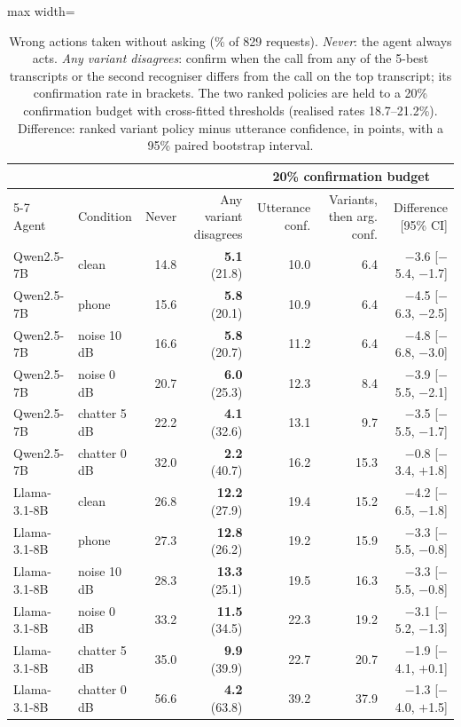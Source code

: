 \begin{table}[t]\centering\small
\begin{adjustbox}{max width=\linewidth}\begin{tabular}{llrrrrr}\toprule
 & & & & \multicolumn{3}{c}{20\% confirmation budget} \\ \cmidrule(lr){5-7}
Agent & Condition & Never & Any variant disagrees & Utterance conf. & Variants, then arg. conf. & Difference [95\% CI] \\
\midrule
Qwen2.5-7B & clean & 14.8 & \textbf{5.1} (21.8) & 10.0 & 6.4 & $-$3.6 [$-$5.4, $-$1.7] \\
Qwen2.5-7B & phone & 15.6 & \textbf{5.8} (20.1) & 10.9 & 6.4 & $-$4.5 [$-$6.3, $-$2.5] \\
Qwen2.5-7B & noise 10 dB & 16.6 & \textbf{5.8} (20.7) & 11.2 & 6.4 & $-$4.8 [$-$6.8, $-$3.0] \\
Qwen2.5-7B & noise 0 dB & 20.7 & \textbf{6.0} (25.3) & 12.3 & 8.4 & $-$3.9 [$-$5.5, $-$2.1] \\
Qwen2.5-7B & chatter 5 dB & 22.2 & \textbf{4.1} (32.6) & 13.1 & 9.7 & $-$3.5 [$-$5.5, $-$1.7] \\
Qwen2.5-7B & chatter 0 dB & 32.0 & \textbf{2.2} (40.7) & 16.2 & 15.3 & $-$0.8 [$-$3.4, $+$1.8] \\
\midrule
Llama-3.1-8B & clean & 26.8 & \textbf{12.2} (27.9) & 19.4 & 15.2 & $-$4.2 [$-$6.5, $-$1.8] \\
Llama-3.1-8B & phone & 27.3 & \textbf{12.8} (26.2) & 19.2 & 15.9 & $-$3.3 [$-$5.5, $-$0.8] \\
Llama-3.1-8B & noise 10 dB & 28.3 & \textbf{13.3} (25.1) & 19.5 & 16.3 & $-$3.3 [$-$5.5, $-$0.8] \\
Llama-3.1-8B & noise 0 dB & 33.2 & \textbf{11.5} (34.5) & 22.3 & 19.2 & $-$3.1 [$-$5.2, $-$1.3] \\
Llama-3.1-8B & chatter 5 dB & 35.0 & \textbf{9.9} (39.9) & 22.7 & 20.7 & $-$1.9 [$-$4.1, $+$0.1] \\
Llama-3.1-8B & chatter 0 dB & 56.6 & \textbf{4.2} (63.8) & 39.2 & 37.9 & $-$1.3 [$-$4.0, $+$1.5] \\
\bottomrule\end{tabular}\end{adjustbox}
\caption{Wrong actions taken without asking (\% of 829 requests). \emph{Never}: the agent always acts. \emph{Any variant disagrees}: confirm when the call from any of the 5-best transcripts or the second recogniser differs from the call on the top transcript; its confirmation rate in brackets. The two ranked policies are held to a 20\% confirmation budget with cross-fitted thresholds (realised rates 18.7--21.2\%). Difference: ranked variant policy minus utterance confidence, in points, with a 95\% paired bootstrap interval.}\label{tab:main}
\end{table}

